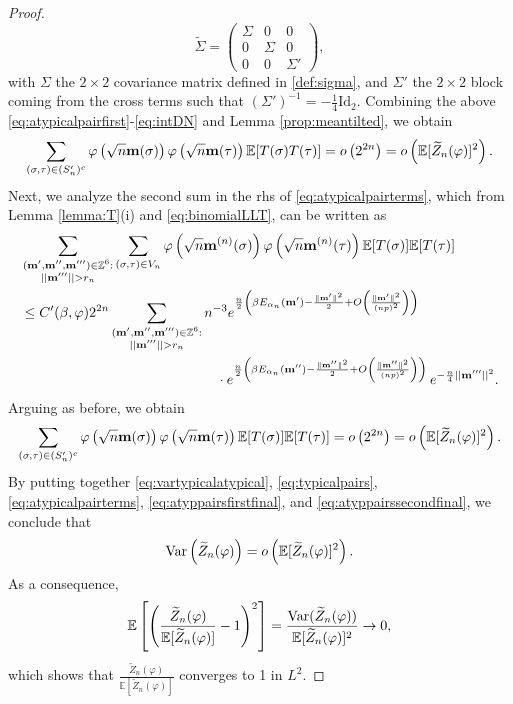 \documentclass[11pt,oneside]{amsart}
\numberwithin{equation}{section}  %
\theoremstyle{plain}
\theoremstyle{remark}
\def \E {{\mathbb E}}
\def \bm {{\bf m}}
\begin{document}
\begin{proof}
\begin{equation*}
\tilde \Sigma = 
\begin{pmatrix}
\Sigma & 0 & 0 \\
0 & \Sigma & 0 \\
0 & 0 & \Sigma'
\end{pmatrix},
\end{equation*}
with $\Sigma$ the $2 \times 2$ covariance matrix defined in \eqref{def:sigma}, and $\Sigma'$ the \(2 \times 2\) block coming from the cross terms such that $(\Sigma')^{-1}=-\frac{1}{4} \text{Id}_2$. Combining the above \eqref{eq:atypicalpairfirst}-\eqref{eq:intDN} and Lemma   \ref{prop:meantilted}, we obtain
\begin{equation}
\label{eq:atyppairsfirstfinal}
\sum_{(\sigma, \tau) \in(S'_n)^c} \varphi\left(\sqrt{n} \bm(\sigma) \right) \varphi\left(\sqrt{n} \bm(\tau) \right) \E[T(\sigma) T(\tau)] = o\left(2^{2n}\right) = o\left( \E[\widetilde{Z}_n(\varphi)]^2\right).
\end{equation}
Next, we analyze the second sum in the rhs of \eqref{eq:atypicalpairterms}, which from Lemma \ref{lemma:T}(i) and \eqref{eq:binomialLLT}, can be written as
\begin{align*}
&\sum_{\substack{(\bm',\bm'',\bm''') \in \mathbb{Z}^6: \\ || \bm'''||>r_n}} \sum_{(\sigma, \tau) \in V_n} \varphi\left(\sqrt{n} \bm^{(n)}(\sigma) \right) \varphi\left(\sqrt{n} \bm^{(n)}(\tau) \right)\E[T(\sigma)] \E [ T(\tau)] \\
 &\leq C'(\beta, \varphi) 2^{2n} \sum_{\substack{(\bm',\bm'',\bm''') \in \mathbb{Z}^6: \\ || \bm'''||>r_n}} n^{-3} e^{\frac{n}{2} \left( \beta E_{\alpha_n}(\bm') -\frac{\| \bm'\|^2}{2}+O\left(\frac{\|\bm'\|^2}{(np)^2}\right)\right)}  \\
 & \qquad \qquad \qquad \qquad\qquad \qquad \qquad  \cdot e^{\frac{n}{2} \left( \beta E_{\alpha_n}(\bm'') -\frac{\| \bm'' \|^2}{2}+O\left(\frac{\|\bm''\|^2}{(np)^2}\right)\right)} \, e^{-\frac{n}{4} ||\bm'''||^2}.
\end{align*}
Arguing as before, we obtain 
\begin{equation}
\label{eq:atyppairssecondfinal}
\sum_{(\sigma, \tau) \in(S'_n)^c} \varphi\left(\sqrt{n} \bm(\sigma) \right) \varphi\left(\sqrt{n} \bm(\tau) \right) \E[T(\sigma)] \E[T(\tau)] = o\left(2^{2n}\right) = o\left( \E[\widetilde{Z}_n(\varphi)]^2\right).
\end{equation}
By putting together \eqref{eq:vartypicalatypical}, \eqref{eq:typicalpairs}, \eqref{eq:atypicalpairterms}, \eqref{eq:atyppairsfirstfinal}, and \eqref{eq:atyppairssecondfinal}, we conclude that
$$
{\rm Var}\left(\widetilde{Z}_n(\varphi)\right) = o\left( \E[\widetilde{Z}_n(\varphi)]^2\right).
$$
As a consequence, 
$$
\mathbb{E}\left[\left(\frac{\widetilde{Z}_n(\varphi)}{\mathbb{E}[\widetilde{Z}_n(\varphi)]} - 1\right)^2\right] 
= \frac{{\rm Var}(\widetilde{Z}_n(\varphi))}{\mathbb{E}[\widetilde{Z}_n(\varphi)]^2} \rightarrow 0,
$$
which shows that $\frac{\widetilde{Z}_n(\varphi)}{\mathbb{E}[\widetilde{Z}_n(\varphi)]}$ converges to 1 in $L^2$.
\end{proof}
\end{document}
